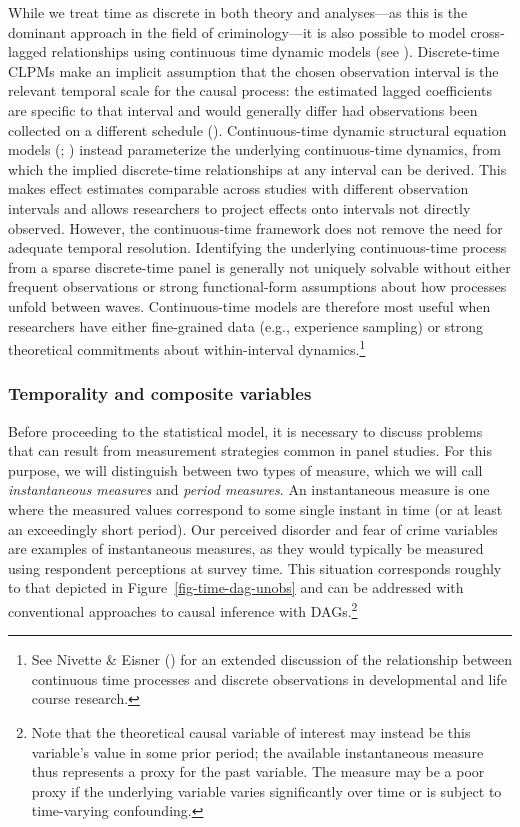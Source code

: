 \documentclass[
  letterpaper,
  DIV=11,
  numbers=noendperiod]{scrartcl}
\begin{document}
While we treat time as discrete in both theory and analyses---as this is
the dominant approach in the field of criminology---it is also possible
to model cross-lagged relationships using continuous time dynamic models
(see ). Discrete-time
CLPMs make an implicit assumption that the chosen observation interval
is the relevant temporal scale for the causal process: the estimated
lagged coefficients are specific to that interval and would generally
differ had observations been collected on a different schedule
().
Continuous-time dynamic structural equation models
(;
)
instead parameterize the underlying continuous-time dynamics, from which
the implied discrete-time relationships at any interval can be derived.
This makes effect estimates comparable across studies with different
observation intervals and allows researchers to project effects onto
intervals not directly observed. However, the continuous-time framework
does not remove the need for adequate temporal resolution. Identifying
the underlying continuous-time process from a sparse discrete-time panel
is generally not uniquely solvable without either frequent observations
or strong functional-form assumptions about how processes unfold between
waves. Continuous-time models are therefore most useful when researchers
have either fine-grained data (e.g., experience sampling) or strong
theoretical commitments about within-interval dynamics.\footnote{See
  Nivette \& Eisner () for an extended
  discussion of the relationship between continuous time processes and
  discrete observations in developmental and life course research.}

\subsubsection{Temporality and composite
variables}\label{temporality-and-composite-variables}

Before proceeding to the statistical model, it is necessary to discuss
problems that can result from measurement strategies common in panel
studies. For this purpose, we will distinguish between two types of
measure, which we will call \emph{instantaneous measures} and
\emph{period measures}. An instantaneous measure is one where the
measured values correspond to some single instant in time (or at least
an exceedingly short period). Our perceived disorder and fear of crime
variables are examples of instantaneous measures, as they would
typically be measured using respondent perceptions at survey time. This
situation corresponds roughly to that depicted in
Figure~\ref{fig-time-dag-unobs} and can be addressed with conventional
approaches to causal inference with DAGs.\footnote{Note that the
  theoretical causal variable of interest may instead be this variable's
  value in some prior period; the available instantaneous measure thus
  represents a proxy for the past variable. The measure may be a poor
  proxy if the underlying variable varies significantly over time or is
  subject to time-varying confounding.}
\end{document}

